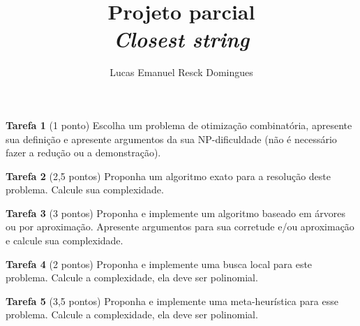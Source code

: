 \documentclass{article}
\title{Projeto parcial \\
\large \textit{Closest string}}
\author{Lucas Emanuel Resck Domingues}
\begin{document}
    \maketitle
    
    \noindent \textbf{Tarefa 1} (1 ponto) Escolha um problema de otimização combinatória, apresente sua definição e apresente argumentos da sua NP-dificuldade (não é necessário fazer a redução ou a demonstração).

    \bigskip

    

    \newpage
    
    \noindent \textbf{Tarefa 2} (2,5 pontos) Proponha um algoritmo exato para a resolução deste     problema. Calcule sua complexidade.

    \bigskip

    

    \newpage
    
    \noindent \textbf{Tarefa 3} (3 pontos) Proponha e implemente um algoritmo baseado em árvores
    ou por aproximação. Apresente argumentos para sua corretude e/ou aproximação e calcule sua complexidade.

    \bigskip

    

    \newpage
    
    \noindent \textbf{Tarefa 4} (2 pontos) Proponha e implemente uma busca local para este problema. Calcule a complexidade, ela deve ser polinomial.

    \bigskip

    

    \newpage
    
    \noindent \textbf{Tarefa 5} (3,5 pontos) Proponha e implemente uma meta-heurística para esse
    problema. Calcule a complexidade, ela deve ser polinomial.

    \bigskip

    

    \newpage

    
    
\end{document}
